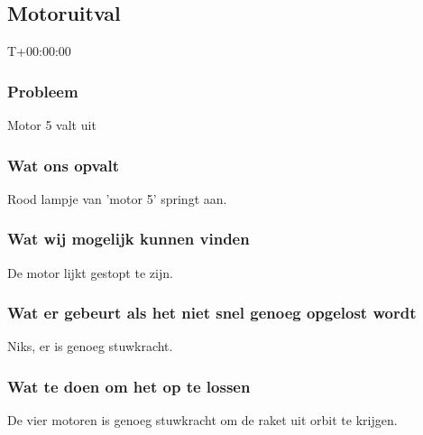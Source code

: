 \subsection{Motoruitval}
T+00:00:00

\subsubsection{Probleem}
Motor 5 valt uit

\subsubsection{Wat ons opvalt}
Rood lampje van 'motor 5' springt aan.

\subsubsection{Wat wij mogelijk kunnen vinden}
De motor lijkt gestopt te zijn.

\subsubsection{Wat er gebeurt als het niet snel genoeg opgelost wordt}
Niks, er is genoeg stuwkracht.

\subsubsection{Wat te doen om het op te lossen}
De vier motoren is genoeg stuwkracht om de raket uit orbit te krijgen.